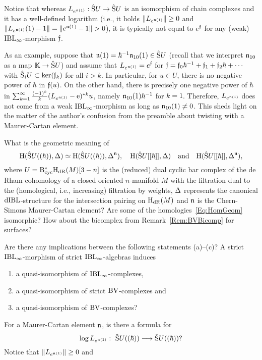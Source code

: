 \documentclass[\MainFolder/Text.tex]{subfiles}
\begin{document}
Notice that whereas $L_{e^{\mathfrak{n}(1)}}: \hat{\mathrm{S}}U \rightarrow\hat{\mathrm{S}}U$ is an isomorphism of chain complexes and it has a well-defined logarithm (i.e., it holds $\| L_{e^{\mathfrak{n}(1)}} \|\ge 0$ and $\Norm{L_{e^{\PMC(1)}}(1)-1}=\Norm{e^{\PMC(1)}-1}>0$), it is typically not equal to $e^{\mathfrak{f}}$ for any (weak) $\mathrm{IBL}_\infty$-morphism $\mathfrak{f}$.

As an example, suppose that $\mathfrak{n}(1) = \hbar^{-1}\mathfrak{n}_{10}(1) \in \hat{\mathrm{S}}U$ (recall that we interpret $\mathfrak{n}_{10}$ as a map $\mathbb{K} \rightarrow \hat{\mathrm{S}}U$) and assume that $L_{e^{\mathfrak{n}(1)}} = e^{\mathfrak{f}}$ for $\mathfrak{f} = \mathfrak{f}_0\hbar^{-1} + \mathfrak{f}_1 + \mathfrak{f}_2\hbar + \dotsb$ with $\hat{\mathrm{S}}_i U \subset \ker(\mathfrak{f}_k)$ for all $i>k$. In particular, for $u\in U$, there is no negative power of $\hbar$ in $\mathfrak{f}(u)$. On the other hand, there is precisely one negative power of $\hbar$ in $\sum_{k=1}^\infty \frac{(-1)^k}{k}(L_{e^{\mathfrak{n}(1)}} - \mathrm{e})^{* k}u$, namely $\mathfrak{n}_{10}(1)\hbar^{-1}$ for $k=1$. Therefore, $L_{e^{\mathfrak{n}(1)}}$ does not come from a weak $\mathrm{IBL}_\infty$-morphism as long as $\mathfrak{n}_{10}(1)\neq 0$. This sheds light on the matter of the author's confusion from the preamble about twisting with a Maurer-Cartan element.

\begin{Remark}\label{Rem:SomeQuestionsFilter}\begin{RemarkList}
\item What is the geometric meaning of 
\begin{equation}\label{Eq:HomGeom}
\mathrm{H}(\hat{\mathrm{S}}U((\hbar)),\operatorname{\Delta}) \simeq \mathrm{H}(\hat{\mathrm{S}}U((\hbar)),\operatorname{\Delta}^{\mathfrak{n}}), \quad\mathrm{H}(\hat{\mathrm{S}}U[[\hbar]],\operatorname{\Delta})\quad\text{and}\quad\mathrm{H}(\hat{\mathrm{S}}U[[\hbar]],\operatorname{\Delta}^{\mathfrak{n}}),
\end{equation}
where $U=\mathrm{B}_{\mathrm{cyc}}^*\mathrm{H}_{\mathrm{dR}}(M)[3-n]$ is the (reduced) dual cyclic bar complex of the de Rham cohomology of a closed oriented $n$-manifold $M$ with the filtration dual to the (homological, i.e., increasing) filtration by weights, $\operatorname{\Delta}$ represents the canonical $\mathrm{dIBL}$-structure for the intersection pairing on $\mathrm{H}_{\mathrm{dR}}(M)$ and $\mathfrak{n}$ is the Chern-Simons Maurer-Cartan element? Are some of the homologies~\eqref{Eq:HomGeom} isomorphic? How about the bicomplex from Remark~\ref{Rem:BVBicomp} for surfaces?
\item Are there any implications between the following statements (a)--(c)? A strict $\mathrm{IBL}_\infty$-morphism of strict $\mathrm{IBL}_\infty$-algebras induces
\begin{enumerate}[label=(\alph*),leftmargin=1.5cm]
\item a quasi-isomorphism of $\mathrm{IBL}_\infty$-complexes,
\item a quasi-isomorphism of strict $\mathrm{BV}$-complexes and
\item a quasi-isomorphism of $\mathrm{BV}$-complexes? 
\end{enumerate}
\item For a Maurer-Cartan element $\mathfrak{n}$, is there a formula for
\[ \log L_{e^{\mathfrak{n}(1)}}:\ \hat{\mathrm{S}}U((\hbar)) \longrightarrow \hat{\mathrm{S}}U((\hbar))? \]
Notice that $\| L_{e^{\mathfrak{n}(1)}} \|\ge 0$ and ${}$
\qedhere
\end{RemarkList}
\end{Remark}
\end{document}
